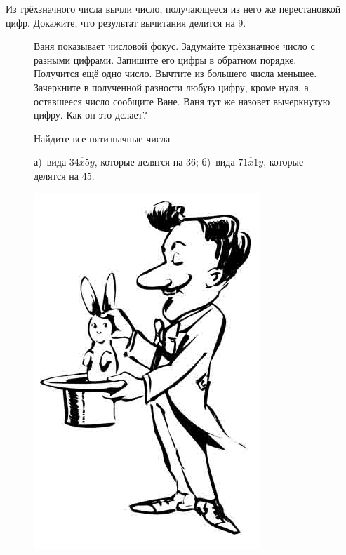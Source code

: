 \begin{thm}
    Из трёхзначного числа вычли число, получающееся из него же перестановкой цифр. Докажите, что результат вычитания делится на 9.
\end{thm}
\setlength{\intextsep}{0pt}
\begin{figure}[h]
\begin{minipage}[h]{0.84\linewidth}\setlength{\parindent}{1.5em}
    \begin{thm}
         Ваня показывает числовой фокус. Задумайте трёхзначное число с разными цифрами. Запишите его цифры в обратном порядке. Получится ещё одно число. Вычтите из большего числа меньшее. Зачеркните в полученной разности любую цифру, кроме нуля, а оставшееся число сообщите Ване. Ваня тут же назовет вычеркнутую цифру. Как он это делает? 
    \end{thm}
    
    \begin{thm}
        Найдите все пятизначные числа 
        \par
        а)~вида $\overline{34x5y}$, которые делятся на 36; б)~вида $\overline{71x1y}$, которые делятся на 45. 
    \end{thm}
\end{minipage}
\begin{minipage}[h]{0.15\linewidth}
    \includegraphics[scale=0.2]{./img/fokusnik}
\end{minipage}
\end{figure}
\setlength{\intextsep}{12pt}